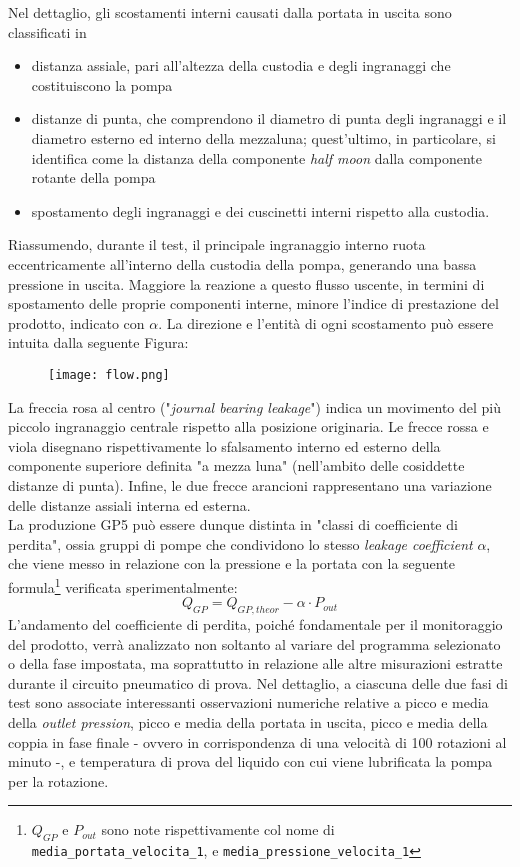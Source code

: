 \documentclass[fleqn,10pt]{SelfArx} %
\begin{document}
Nel dettaglio, gli scostamenti interni causati dalla portata in uscita sono classificati in
\begin{itemize}
    \item distanza assiale, pari all'altezza della custodia e degli ingranaggi che costituiscono la pompa
    \item distanze di punta, che comprendono il diametro di punta degli ingranaggi e il diametro esterno ed interno della mezzaluna; quest'ultimo, in particolare, si identifica come la distanza della componente \textit{half moon} dalla componente rotante della pompa
    \item spostamento degli ingranaggi e dei cuscinetti interni rispetto alla custodia.
\end{itemize}
Riassumendo, durante il test, il principale ingranaggio interno ruota eccentricamente all'interno della custodia della pompa, generando una bassa pressione in uscita. Maggiore la reazione a questo flusso uscente, in termini di spostamento delle proprie componenti interne, minore l'indice di prestazione del prodotto, indicato con $\alpha$. La direzione e l'entità di ogni scostamento può essere intuita dalla seguente Figura:
\begin{figure}[H]
    \centering
    \texttt{[image: flow.png]}
    \label{fig:em}
\end{figure}
La freccia rosa al centro ("\textit{journal bearing leakage}") indica un movimento del più piccolo ingranaggio centrale rispetto alla posizione originaria. Le frecce rossa e viola disegnano rispettivamente lo sfalsamento interno ed esterno della componente superiore definita "a mezza luna" (nell'ambito delle cosiddette distanze di punta). Infine, le due frecce arancioni rappresentano una variazione delle distanze assiali interna ed esterna.\\
La produzione GP5 può essere dunque distinta in "classi di coefficiente di perdita", ossia gruppi di pompe che condividono lo stesso \textit{leakage coefficient} $\alpha$, che viene messo in relazione con la pressione e la portata con la seguente formula\footnote{$Q_{GP}$ e $P_{out}$ sono note rispettivamente col nome di \texttt{media\_portata\_velocita\_1}, e \texttt{media\_pressione\_velocita\_1}} verificata sperimentalmente:
\begin{equation}
    Q_{GP} = Q_{GP,theor} − \alpha \cdot P_{out}
\end{equation}
L'andamento del coefficiente di perdita, poiché fondamentale per il monitoraggio del prodotto, verrà analizzato non soltanto al variare del programma selezionato o della fase impostata, ma soprattutto in relazione alle altre misurazioni estratte durante il circuito pneumatico di prova. Nel dettaglio, a ciascuna delle due fasi di test sono associate interessanti osservazioni numeriche relative a picco e media della \textit{outlet pression}, picco e media della portata in uscita, picco e media della coppia in fase finale - ovvero in corrispondenza di una velocità di 100 rotazioni al minuto -, e temperatura di prova del liquido con cui viene lubrificata la pompa per la rotazione.
\end{document}
